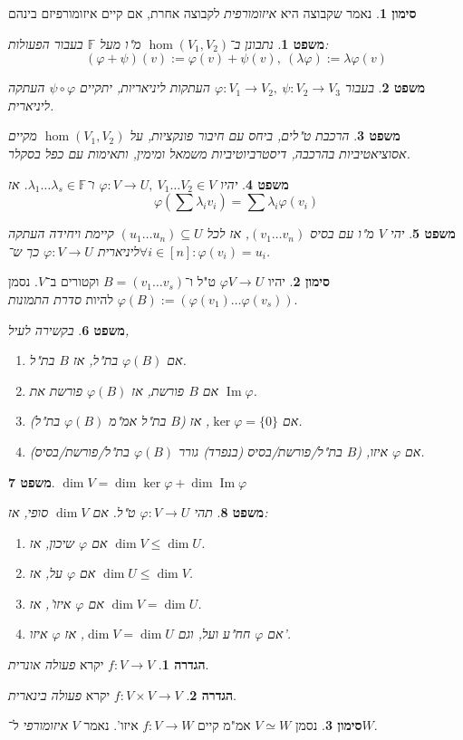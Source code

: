 \documentclass[]{article}
\DeclareMathOperator\Img   {Im}
\newcommand\F         {\mathbb{F}}
\newcommand\co        {\colon}
\renewcommand\lg      {\lambda}
\renewcommand\phi     {\varphi}
\newtheorem{Theorem}{משפט}
\theoremstyle{definition}
\newtheorem{definition}{הגדרה}
\newtheorem{Notion}{סימון}
\newcommand\theo  [1] {\begin{Theorem}#1\end{Theorem}}
\newcommand\defi  [1] {\begin{definition}#1\end{definition}}
\newcommand\noti  [1] {\begin{Notion}#1\end{Notion}}
\begin{document}
\begin{multicols}{2}
{\begin{enumerate}
		\end{enumerate}}
		\noti{נאמר שקבוצה היא \textit{איזומורפית} לקבוצה אחרת, אם קיים איזומורפיזם בינהם}
		\theo{נתבונן ב־$\hom(V_1, V_2)$ מ"ו מעל $\F$ בעבור הפעולות: 
		\[ (\phi + \psi)(v) := \phi(v) + \psi(v), \ (\lg\phi) := \lg\phi(v) \]}
		\theo{בעבור $\phi \co V_1 \to V_2, \ \psi \co V_2 \to V_3$ העתקות ליניאריות, יתקיים $\psi \circ \phi$ העתקה ליניארית. }
		\theo{הרכבת ט"לים, ביחס עם חיבור פונקציות, על $\hom(V_1, V_2)$ מקיים אסוציאטיביות בהרכבה, דיסטרביוטיביות משמאל ומימין, ותאימות עם כפל בסקלר. }
		\theo{יהיו $\phi \co V \to U, \ V_1 \dots V_2 \in V$ ו־$\lg_1 \dots \lg_s \in \F$. אז 
		\[ \phi(\sum\lg_iv_i) = \sum\lg_i\phi(v_i) \]}
		\theo{יהי $V$ מ"ו עם בסיס $(v_1 \dots v_n)$, אז לכל $(u_1 \dots u_n) \subseteq U$ קיימת ויחידה העתקה ליניארית $\phi \co V \to U$ כך ש־$\forall i \in [n] \co \phi(v_i) = u_i$. }
		\noti{יהיו $\phi V \to U$ ט"ל ו־$B = (v_1 \dots v_s)$ וקטורים ב־$V$. נסמן $\phi(B) := (\phi(v_1) \dots \phi(v_s))$ להיות \textit{סדרת התמונות}. }
		\theo{בקשירה לעיל, 
		\begin{enumerate}
			\item אם $\phi(B)$ בת"ל, אז $B$ בת"ל. 
			\item אם $B$ פורשת, אז $\phi(B)$ פורשת את $\Img\phi$. 
			\item אם $\ker\phi = \{0\}$, אז ($B$ בת"ל אמ"מ $\phi(B)$ בת"ל). 
			\item אם $\phi$ איזו, ($B$ בת"ל/פורשת/בסיס (בנפרד) גורר $\phi(B)$ בת"ל/פורשת/בסיס). 
		\end{enumerate}}
		\theo{\hfil $\dim V = \dim \ker\phi + \dim\Img\phi$}
		\theo{תהי $\phi \co V \to U$ ט"ל. אם $\dim V$ סופי, אז: 
		\begin{enumerate}
			\item אם $\phi$ שיכון, אז $\dim V \le \dim U$. 
			\item אם $\phi$ על, אז $\dim U \le \dim V$. 
			\item אם $\phi$ איזו', אז $\dim V = \dim U$. 
			\item אם $\phi$ חח"ע ועל, וגם $\dim V = \dim U$, אז $\phi$ איזו'. 
		\end{enumerate}}
		\defi{$f \co V \to V$ יקרא \textit{פעולה אונרית}. }
		\defi{$f \co V \times V \to V$ יקרא \textit{פעולה בינארית}. }
		\noti{נסמן $V \simeq W$ אמ"מ קיים $f \co V \to W$ איזו'. נאמר $V$ \textit{איזומורפי} ל־$W$. }
		

\end{multicols}
\end{document}
